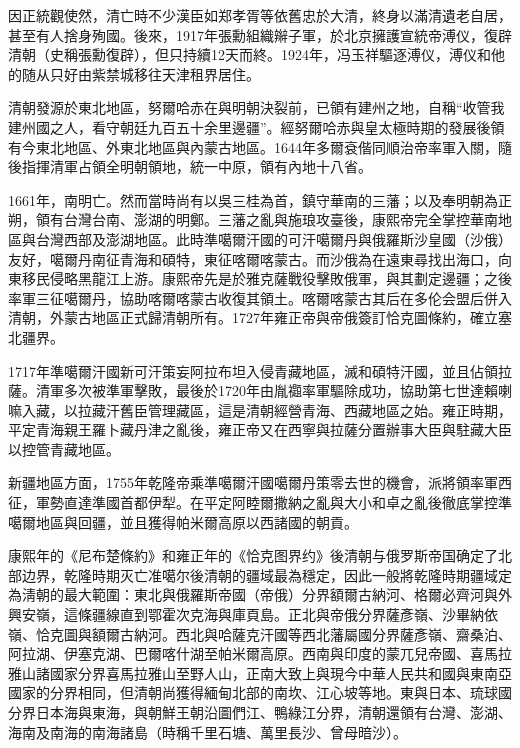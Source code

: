 因正統觀使然，清亡時不少漢臣如郑孝胥等依舊忠於大清，終身以滿清遺老自居，甚至有人捨身殉國。後來，1917年張勳組織辮子軍，於北京擁護宣統帝溥仪，復辟清朝（史稱張勳復辟），但只持續12天而終。1924年，冯玉祥驅逐溥仪，溥仪和他的随从只好由紫禁城移往天津租界居住。

清朝發源於東北地區，努爾哈赤在與明朝決裂前，已領有建州之地，自稱“收管我建州國之人，看守朝廷九百五十余里邊疆”。經努爾哈赤與皇太極時期的發展後領有今東北地區、外東北地區與內蒙古地區。1644年多爾袞偕同順治帝率軍入關，隨後指揮清軍占領全明朝領地，統一中原，領有內地十八省。

1661年，南明亡。然而當時尚有以吳三桂為首，鎮守華南的三藩；以及奉明朝為正朔，領有台灣台南、澎湖的明鄭。三藩之亂與施琅攻臺後，康熙帝完全掌控華南地區與台灣西部及澎湖地區。此時準噶爾汗國的可汗噶爾丹與俄羅斯沙皇國（沙俄）友好，噶爾丹南征青海和碩特，東征喀爾喀蒙古。而沙俄為在遠東尋找出海口，向東移民侵略黑龍江上游。康熙帝先是於雅克薩戰役擊敗俄軍，與其劃定邊疆；之後率軍三征噶爾丹，協助喀爾喀蒙古收復其領土。喀爾喀蒙古其后在多伦会盟后併入清朝，外蒙古地區正式歸清朝所有。1727年雍正帝與帝俄簽訂恰克圖條約，確立塞北疆界。

1717年準噶爾汗國新可汗策妄阿拉布坦入侵青藏地區，滅和碩特汗國，並且佔領拉薩。清軍多次被準軍擊敗，最後於1720年由胤禵率軍驅除成功，協助第七世達賴喇嘛入藏，以拉藏汗舊臣管理藏區，這是清朝經營青海、西藏地區之始。雍正時期，平定青海親王羅卜藏丹津之亂後，雍正帝又在西寧與拉薩分置辦事大臣與駐藏大臣以控管青藏地區。

新疆地區方面，1755年乾隆帝乘準噶爾汗國噶爾丹策零去世的機會，派將領率軍西征，軍勢直達準國首都伊犁。在平定阿睦爾撒納之亂與大小和卓之亂後徹底掌控準噶爾地區與回疆，並且獲得帕米爾高原以西諸國的朝貢。

康熙年的《尼布楚條約》和雍正年的《恰克图界约》後清朝与俄罗斯帝国确定了北部边界，乾隆時期灭亡准噶尔後清朝的疆域最為穩定，因此一般將乾隆時期疆域定為淸朝的最大範圍：東北與俄羅斯帝國（帝俄）分界額爾古納河、格爾必齊河與外興安嶺，這條疆線直到鄂霍次克海與庫頁島。正北與帝俄分界薩彥嶺、沙畢納依嶺、恰克圖與額爾古納河。西北與哈薩克汗國等西北藩屬國分界薩彥嶺、齋桑泊、阿拉湖、伊塞克湖、巴爾喀什湖至帕米爾高原。西南與印度的蒙兀兒帝國、喜馬拉雅山諸國家分界喜馬拉雅山至野人山，正南大致上與現今中華人民共和國與東南亞國家的分界相同，但清朝尚獲得緬甸北部的南坎、江心坡等地。東與日本、琉球國分界日本海與東海，與朝鮮王朝沿圖們江、鴨綠江分界，清朝還領有台灣、澎湖、海南及南海的南海諸島（時稱千里石塘、萬里長沙、曾母暗沙）。

